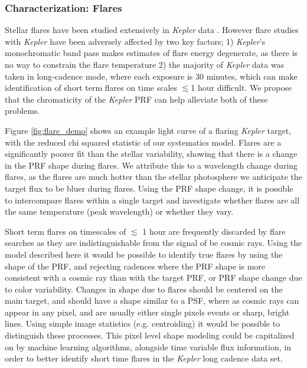 \documentclass[iop]{emulateapj}
\newcommand{\kepler}{\emph{Kepler}\xspace}
\newcommand{\ch}[1]{\textcolor{red}{\texttt{#1}}\xspace}
\begin{document}
\subsubsection{Characterization: Flares}

Stellar flares have been studied extensively in \kepler data \citep[see e.g.][]{flares1, flares2}. However flare studies with \kepler have been adversely affected by two key factors; 1) \kepler's monochromatic band pass makes estimates of flare energy degenerate, as there is no way to constrain the flare temperature 2) the majority of \kepler data was taken in long-cadence mode, where each exposure is 30 minutes, which can make identification of short term flares on time scales $\lesssim$1 hour difficult. We propose that the chromaticity of the \kepler PRF can help alleviate both of these problems.

Figure \ref{fig:flare_demo} shows an example light curve of a flaring \kepler target, with the reduced chi squared statistic of our systematics model. Flares are a significantly poorer fit than the stellar variability, showing that there is a change in the PRF shape during flares. We attribute this to a wavelength change during flares, as the flares are much hotter than the stellar photosphere we anticipate the target flux to be bluer during flares. Using the PRF shape change, it is possible to intercompare flares within a single target and investigate whether flares are all the same temperature (peak wavelength) or whether they vary.

Short term flares on timescales of $\lesssim$ 1 hour are frequently discarded by flare searches as they are indistinguishable from the signal of be cosmic rays. Using the model described here it would be possible to identify true flares by using the shape of the PRF, and rejecting cadences where the PRF shape is more consistent with a cosmic ray than with the target PRF, or PRF shape change due to color variability. Changes in shape due to flares should be centered on the main target, and should have a shape similar to a PSF, where as cosmic rays can appear in any pixel, and are usually either single pixels events or sharp, bright lines. Using simple image statistics (e.g. centroiding) it would be possible to distinguish these processes. This pixel level shape modeling could be capitalized on by machine learning algorithms, alongside time variable flux information, in order to better identify short time flares in the \kepler long cadence data set.
\end{document}
